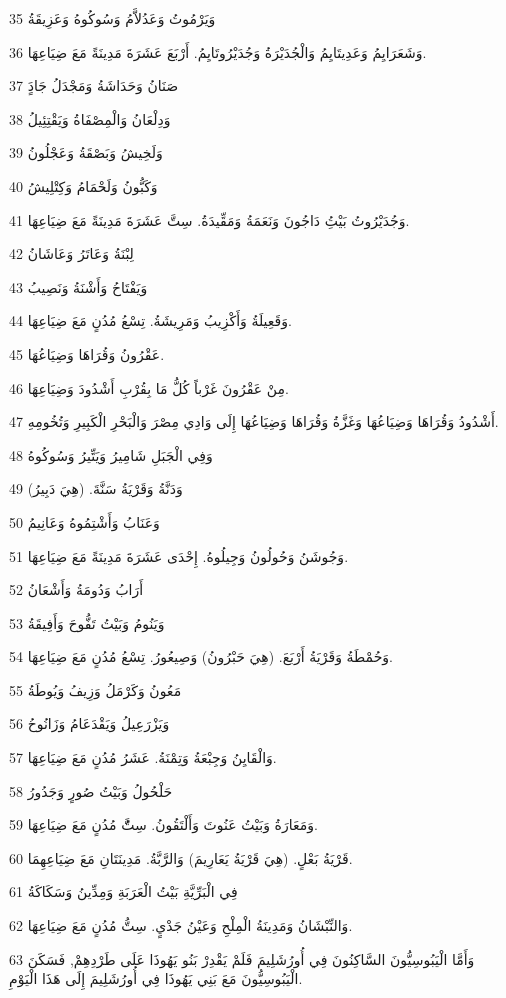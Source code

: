 \par 35 وَيَرْمُوتُ وَعَدُلاَّمُ وَسُوكُوهُ وَعَزِيقَةُ
\par 36 وَشَعَرَايِمُ وَعَدِيتَايِمُ وَالْجُدَيْرَةُ وَجُدَيْرُوتَايِمُ. أَرْبَعَ عَشَرَةَ مَدِينَةً مَعَ ضِيَاعِهَا.
\par 37 صَنَانُ وَحَدَاشَةُ وَمَجْدَلُ جَادٍَ
\par 38 وَدِلْعَانُ وَالْمِصْفَاةُ وَيَقْتِئِيلُ
\par 39 وَلَخِيشُ وَبَصْقَةُ وَعَجْلُونُ
\par 40 وَكَبُّونُ وَلَحْمَامُ وَكِتْلِيشُ
\par 41 وَجُدَيْرُوتُ بَيْتُِ دَاجُونَ وَنَعَمَةُ وَمَقِّيدَةُ. سِتَّ عَشَرَةَ مَدِينَةً مَعَ ضِيَاعِهَا.
\par 42 لِبْنَةُ وَعَاتَرُ وَعَاشَانُ
\par 43 وَيَفْتَاحُ وَأَشْنَةُ وَنَصِيبُ
\par 44 وَقَعِيلَةُ وَأَكْزِيبُ وَمَرِيشَةُ. تِسْعُ مُدُنٍ مَعَ ضِيَاعِهَا.
\par 45 عَقْرُونُ وَقُرَاهَا وَضِيَاعُهَا.
\par 46 مِنْ عَقْرُونَ غَرْباً كُلُّ مَا بِقُرْبِ أَشْدُودَ وَضِيَاعِهَا.
\par 47 أَشْدُودُ وَقُرَاهَا وَضِيَاعُهَا وَغَزَّةُ وَقُرَاهَا وَضِيَاعُهَا إِلَى وَادِي مِصْرَ وَالْبَحْرِ الْكَبِيرِ وَتُخُومِهِ.
\par 48 وَفِي الْجَبَلِ شَامِيرُ وَيَتِّيرُ وَسُوكُوهُ
\par 49 وَدَنَّةُ وَقَرْيَةُ سَنَّةَ. (هِيَ دَبِيرُ)
\par 50 وَعَنَابُ وَأَشْتِمُوهُ وَعَانِيمُ
\par 51 وَجُوشَنُ وَحُولُونُ وَجِيلُوهُ. إِحْدَى عَشَرَةَ مَدِينَةً مَعَ ضِيَاعِهَا.
\par 52 أَرَابُ وَدُومَةُ وَأَشْعَانُ
\par 53 وَيَنُومُ وَبَيْتُ تَفُّوحَ وَأَفِيقَةُ
\par 54 وَحُمْطَةُ وَقَرْيَةُ أَرْبَعَ. (هِيَ حَبْرُونُ) وَصِيعُورُ. تِسْعُ مُدُنٍ مَعَ ضِيَاعِهَا.
\par 55 مَعُونُ وَكَرْمَلُ وَزِيفُ وَيُوطَةُ
\par 56 وَيَزْرَعِيلُ وَيَقْدَعَامُ وَزَانُوحُ
\par 57 وَالْقَايِنُ وَجِبْعَةُ وَتِمْنَةُ. عَشَرُ مُدُنٍ مَعَ ضِيَاعِهَا.
\par 58 حَلْحُولُ وَبَيْتُ صُورٍ وَجَدُورُ
\par 59 وَمَعَارَةُ وَبَيْتُ عَنُوتَ وَأَلْتَقُونُ. سِتَُّ مُدُنٍ مَعَ ضِيَاعِهَا.
\par 60 قَرْيَةُ بَعْلٍ. (هِيَ قَرْيَةُ يَعَارِيمَ) وَالرَّبَّةُ. مَدِينَتَانِ مَعَ ضِيَاعِهِمَا.
\par 61 فِي الْبَرِّيَّةِ بَيْتُ الْعَرَبَةِ وَمِدِّينُ وَسَكَاكَةُ
\par 62 وَالنِّبْشَانُ وَمَدِينَةُ الْمِلْحِ وَعَيْنُ جَدْيٍ. سِتُّ مُدُنٍ مَعَ ضِيَاعِهَا.
\par 63 وَأَمَّا الْيَبُوسِيُّونَ السَّاكِنُونَ فِي أُورُشَلِيمَ فَلَمْ يَقْدِرْ بَنُو يَهُوذَا عَلَى طَرْدِهِمْ, فَسَكَنَ الْيَبُوسِيُّونَ مَعَ بَنِي يَهُوذَا فِي أُورُشَلِيمَ إِلَى هَذَا الْيَوْمِ.

